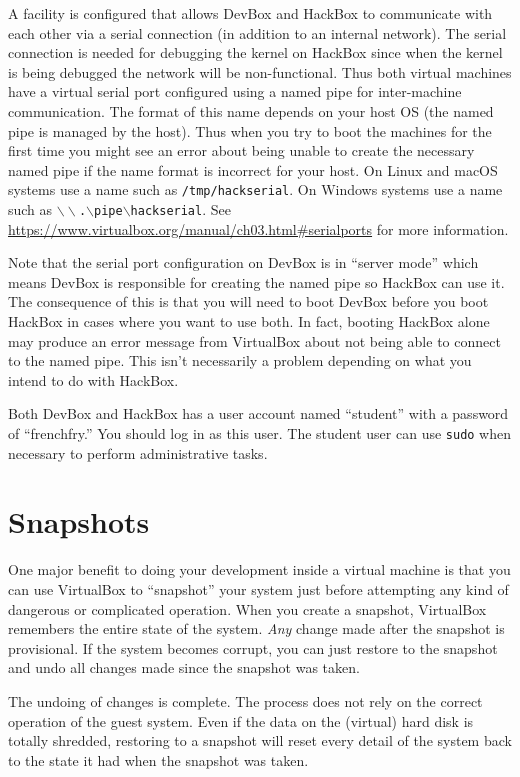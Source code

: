 \documentclass[twocolumn]{article}
\newcommand{\filename}[1]{\texttt{#1}}
\begin{document}
A facility is configured that allows DevBox and HackBox to communicate with each other via a
serial connection (in addition to an internal network). The serial connection is needed for
debugging the kernel on HackBox since when the kernel is being debugged the network will be
non-functional. Thus both virtual machines have a virtual serial port configured using a named
pipe for inter-machine communication. The format of this name depends on your host OS (the named
pipe is managed by the host). Thus when you try to boot the machines for the first time you
might see an error about being unable to create the necessary named pipe if the name format is
incorrect for your host. On Linux and macOS systems use a name such as
\filename{/tmp/hackserial}. On Windows systems use a name such as
\filename{$\backslash\backslash$.$\backslash$pipe$\backslash$hackserial}. See
\url{https://www.virtualbox.org/manual/ch03.html#serialports} for more information.

Note that the serial port configuration on DevBox is in ``server mode'' which means DevBox is
responsible for creating the named pipe so HackBox can use it. The consequence of this is that
you will need to boot DevBox before you boot HackBox in cases where you want to use both. In
fact, booting HackBox alone may produce an error message from VirtualBox about not being able to
connect to the named pipe. This isn't necessarily a problem depending on what you intend to do
with HackBox.

Both DevBox and HackBox has a user account named ``student'' with a password of ``frenchfry.''
You should log in as this user. The student user can use \texttt{sudo} when necessary to perform
administrative tasks.

\section{Snapshots}

One major benefit to doing your development inside a virtual machine is that you can use
VirtualBox to ``snapshot'' your system just before attempting any kind of dangerous or
complicated operation. When you create a snapshot, VirtualBox remembers the entire state of the
system. \emph{Any} change made after the snapshot is provisional. If the system becomes corrupt,
you can just restore to the snapshot and undo all changes made since the snapshot was taken.

The undoing of changes is complete. The process does not rely on the correct operation of the
guest system. Even if the data on the (virtual) hard disk is totally shredded, restoring to a
snapshot will reset every detail of the system back to the state it had when the snapshot was
taken.
\end{document}
